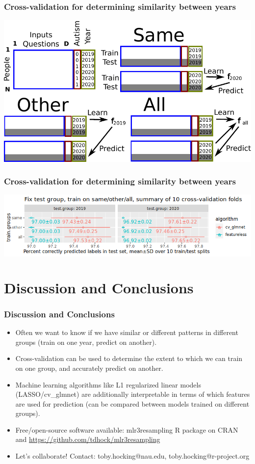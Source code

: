 \documentclass{beamer}
\begin{document}
\begin{frame}
  \frametitle{Cross-validation for determining similarity between years}
  \includegraphics[width=\textwidth]{drawing-cv-same-other-years-4.pdf}
\end{frame}

\begin{frame}
  \frametitle{Cross-validation for determining similarity between years}
  \includegraphics[width=\textwidth]{download-nsch-mlr3batchmark-registry-predict-new-year.png}
\end{frame}

\section{Discussion and Conclusions}

\begin{frame}
  \frametitle{Discussion and Conclusions}
  \begin{itemize}
  \item Often we want to know if we have similar or different patterns
    in different groups (train on one year, predict
    on another).
  \item Cross-validation can be used to determine the extent to which
    we can train on one group, and accurately predict on another.
  \item Machine learning algorithms like L1 regularized linear models
    (LASSO/cv\_glmnet) are additionally interpretable in terms of which features
    are used for prediction (can be compared between models trained on
    different groups).
  \item Free/open-source software available: mlr3resampling R package
    on CRAN and \url{https://github.com/tdhock/mlr3resampling}
  \item Let's collaborate! Contact: toby.hocking@nau.edu,
    toby.hocking@r-project.org
  \end{itemize}
\end{frame}
\end{document}
